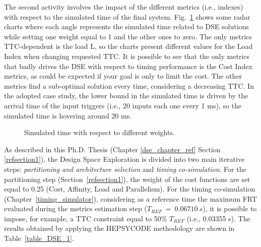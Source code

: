 %
The second activity involves the impact of the different metrics (i.e., indexes) with respect to the simulated time of the final system. Fig.~\ref{fig1_radar} shows some radar charts where each angle represents the simulated time related to DSE solutions while setting one weight equal to 1 and the other ones to zero. The only metrics TTC-dependent is the load L, so the charts present different values for the Load Index when changing requested TTC. It is possible to see that the only metrics that badly drives the DSE with respect to timing performance is the Cost Index metrics, as could be expected if your goal is only to limit the cost. The other metrics find a sub-optimal solution every time, considering a decreasing TTC. In the adopted case study, the lower bound in the simulated time is driven by the arrival time of the input triggers (i.e., 20 inputs each one every 1 ms), so the simulated time is hovering around 20 ms. \par
%
\begin{figure}[htbp]
    \centering
    \label{1aa} 
    \label{1bb} 
    \label{1cc} 
  \caption{Simulated time with respect to different weights.} 
  \label{fig1_radar} 
\end{figure}
%
As described in this Ph.D. Thesis (Chapter \ref{dse_chapter_ref} Section \ref{refsection1}), the Design Space Exploration is divided into two main iterative steps: \textit{partitioning and architecture selection} and \textit{timing co-simulation}. For the partitioning step (Section~\ref{refsection1}), the weight of the cost functions are set equal to 0.25 (Cost, Affinity, Load and Parallelism). For the timing co-simulation (Chapter~\ref{timing_simulator}), considering as a reference time the maximum FRT evaluated during the metrics estimation step ($T_{REF} \ = \ 0.06710 \ s$), it is possible to impose, for example, a TTC constraint equal to 50\% $T_{REF}$ (i.e., 0.03355 s). The results obtained by applying the HEPSYCODE methodology are shown in Table~\ref{table_DSE_1}. \par
%
